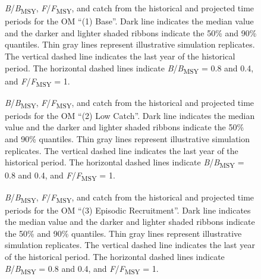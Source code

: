 \documentclass[11pt]{book}
\begin{document}
\begin{figure}[htb]

{\centering {} 

}

\caption{\emph{B}/\emph{B}\textsubscript{MSY}, \emph{F}/\emph{F}\textsubscript{MSY}, and catch from the historical and projected time periods for the OM ``(1) Base''. Dark line indicates the median value and the darker and lighter shaded ribbons indicate the 50\% and 90\% quantiles. Thin gray lines represent illustrative simulation replicates. The vertical dashed line indicates the last year of the historical period. The horizontal dashed lines indicate \emph{B}/\emph{B}\textsubscript{MSY} = 0.8 and 0.4, and \emph{F}/\emph{F}\textsubscript{MSY} = 1.}\label{fig:proj-updog-fixsel}
\end{figure}

\begin{figure}[htb]

{\centering {} 

}

\caption{\emph{B}/\emph{B}\textsubscript{MSY}, \emph{F}/\emph{F}\textsubscript{MSY}, and catch from the historical and projected time periods for the OM ``(2) Low Catch''. Dark line indicates the median value and the darker and lighter shaded ribbons indicate the 50\% and 90\% quantiles. Thin gray lines represent illustrative simulation replicates. The vertical dashed line indicates the last year of the historical period. The horizontal dashed lines indicate \emph{B}/\emph{B}\textsubscript{MSY} = 0.8 and 0.4, and \emph{F}/\emph{F}\textsubscript{MSY} = 1.}\label{fig:proj-low-catch}
\end{figure}

\begin{figure}[htb]

{\centering {} 

}

\caption{\emph{B}/\emph{B}\textsubscript{MSY}, \emph{F}/\emph{F}\textsubscript{MSY}, and catch from the historical and projected time periods for the OM ``(3) Episodic Recruitment''. Dark line indicates the median value and the darker and lighter shaded ribbons indicate the 50\% and 90\% quantiles. Thin gray lines represent illustrative simulation replicates. The vertical dashed line indicates the last year of the historical period. The horizontal dashed lines indicate \emph{B}/\emph{B}\textsubscript{MSY} = 0.8 and 0.4, and \emph{F}/\emph{F}\textsubscript{MSY} = 1.}\label{fig:proj-episodic-recruitment}
\end{figure}
\end{document}
